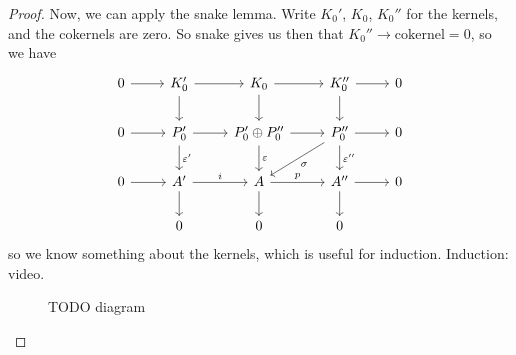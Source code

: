 \begin{proof}
    Now, we can apply the snake lemma.
    Write  $K_0'$,  $K_0$, $ K_0''$ for the kernels, and the cokernels are zero.
    So snake gives us then that $K_0'' \to  \text{cokernel} = 0$, so we have
    \[
        \begin{tikzcd}
            0 \arrow[r, ""] & K_0' \arrow[d, ""]\arrow[r, ""] & K_0 \arrow[d, ""]\arrow[r, ""] & K_0'' \arrow[d, ""]\arrow[r, ""] & 0\\
            0 \arrow[r, ""]& P_0' \arrow[r, ""]\arrow[d, "\epsilon'"] & P_0' \oplus P_0'' \arrow[d, "\epsilon"]\arrow[r, " "]& P_0'' \arrow[d, "\epsilon''"] \arrow[r, ""]\arrow[dl, "\sigma"] & 0\\
            0 \arrow[r, ""] & A'\arrow[d, ""] \arrow[r, "i"] & A \arrow[d, ""] \arrow[r, "p"] & A'' \arrow[d, ""]\arrow[r, ""] & 0\\
                            & 0 & 0& 0 &
        \end{tikzcd}
    \]
    so we know something about the kernels, which is useful for induction.
    Induction: video.

\begin{figure}[H]
    \centering
    \caption{TODO diagram}
    \label{fig:diagram}
\end{figure}
\end{proof}

